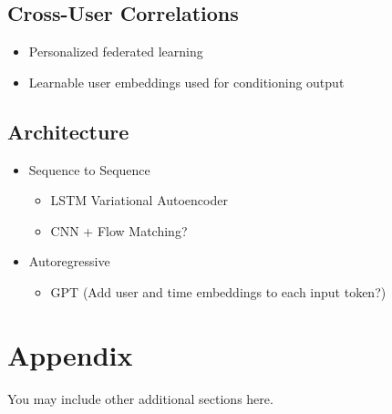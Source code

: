 \documentclass{article} %
\begin{document}
\subsection{Cross-User Correlations}

\begin{itemize}
    \item Personalized federated learning
    \item Learnable user embeddings used for conditioning output
\end{itemize}

\subsection{Architecture}

\begin{itemize}
    \item Sequence to Sequence
    \begin{itemize}
        \item LSTM Variational Autoencoder
        \item CNN + Flow Matching?
    \end{itemize}
    \item Autoregressive
    \begin{itemize}
        \item GPT (Add user and time embeddings to each input token?)
    \end{itemize}
\end{itemize}





\appendix
\section{Appendix}
You may include other additional sections here.
\end{document}
